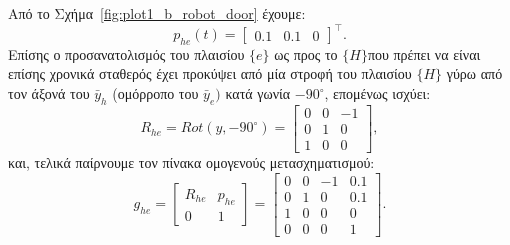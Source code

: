 \documentclass[12pt]{article} %
\numberwithin{equation}{section}  %
\begin{document}
Από το Σχήμα~\ref{fig:plot1_b_robot_door} έχουμε:
\begin{equation}\label{eq:phe}
    p_{he}(t) = \begin{bmatrix} 0.1 & 0.1 & 0 \end{bmatrix}^{\top}.
\end{equation}
Επίσης ο προσανατολισμός του πλαισίου $\{e\}$ ως προς το $\{H\}$\textemdash που πρέπει να είναι επίσης χρονικά σταθερός\textemdash 
έχει προκύψει από μία στροφή του πλαισίου $\{H\}$ γύρω από τον άξονά του $\bar{y}_h$ (ομόρροπο του $\bar{y}_e)$ κατά γωνία $-90^{\circ}$, 
επομένως ισχύει:
\begin{equation}\label{eq:Rhe}
        R_{he} = Rot(y, -90^{\circ}) = \begin{bmatrix}
        0   &  0  &  -1  \\
        0   &  1  &  0   \\
        1   &  0  &  0
    \end{bmatrix},
\end{equation}
και, τελικά παίρνουμε τον πίνακα ομογενούς μετασχηματισμού:
\begin{equation} \label{eq:g_he}
    g_{he} = \begin{bmatrix} R_{he} & p_{he}  \\ 0 & 1\end{bmatrix} = 
    \begin{bmatrix} 
        0   &  0  & -1  &  0.1  \\
        0   &  1  &  0  &  0.1  \\
        1   &  0  &  0  &  0  \\
        0   &  0  &  0  &  1  
    \end{bmatrix}.
\end{equation}
\end{document}
